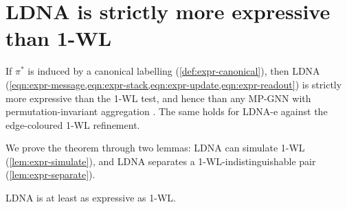 \section{LDNA is strictly more expressive than 1-WL}
\label{sec:expr-main}

\begin{theorem}
\label{thm:expr-strict}
If $\pi^*$ is induced by a canonical labelling (\cref{def:expr-canonical}), then
LDNA (\cref{eqn:expr-message,eqn:expr-stack,eqn:expr-update,eqn:expr-readout}) is
strictly more expressive than the 1-WL test, and hence than any MP-GNN with
permutation-invariant aggregation \citep{Xu2019GIN,Morris2019WL}. The same holds
for LDNA-e against the edge-coloured 1-WL refinement.
\end{theorem}

We prove the theorem through two lemmas: LDNA can simulate 1-WL
(\cref{lem:expr-simulate}), and LDNA separates a 1-WL-indistinguishable pair
(\cref{lem:expr-separate}).

\begin{lemma}[Simulation]
\label{lem:expr-simulate}
LDNA is at least as expressive as 1-WL.
\end{lemma}

